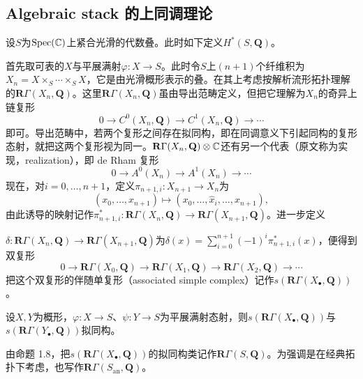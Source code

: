 \subsection{Algebraic stack 的上同调理论}

设$S$为$\operatorname{Spec}(\mathbb{C})$上紧合光滑的代数叠。此时如下定义$H^*(S,\mathbf{Q})$。

首先取可表的$X$与平展满射$\varphi:X\to S$。此时令$S$上$(n+1)$个纤维积为$X_n=X\times_S\cdots\times_SX$，它是由光滑概形表示的叠。在其上考虑按解析流形拓扑理解的$\mathbf{R}\Gamma(X_n,\mathbf{Q})$。这里$\mathbf{R}\Gamma(X_n,\mathbf{Q})$虽由导出范畴定义，但把它理解为$X_n$的奇异上链复形
\[
0\to C^0(X_n,\mathbf{Q})\to C^1(X_n,\mathbf{Q})\to\cdots
\]
即可。导出范畴中，若两个复形之间存在拟同构，即在同调意义下引起同构的复形态射，就把这两个复形视为同一。$\mathbf{R}\Gamma(X_n,\mathbf{Q})\otimes\mathbb{C}$还有另一个代表（原文称为实现，realization），即 de Rham 复形
\[
0\to A^0(X_n)\to A^1(X_n)\to\cdots
\]
现在，对$i=0,\ldots,n+1$，定义$\pi_{n+1,i}:X_{n+1}\to X_n$为
\[
(x_0,\ldots,x_{n+1})\mapsto(x_0,\ldots,\hat x_i,\ldots,x_{n+1}),
\]
由此诱导的映射记作$\pi^*_{n+1,i}:\mathbf{R}\Gamma(X_n,\mathbf{Q})\to\mathbf{R}\Gamma(X_{n+1},\mathbf{Q})$。进一步定义

$\delta:\mathbf{R}\Gamma(X_n,\mathbf{Q})\to\mathbf{R}\Gamma(X_{n+1},\mathbf{Q})$为$\delta(x)=\sum_{i=0}^{n+1}(-1)^i\pi^*_{n+1,i}(x)$，便得到双复形
\[
0\to\mathbf{R}\Gamma(X_0,\mathbf{Q})\to\mathbf{R}\Gamma(X_1,\mathbf{Q})\to\mathbf{R}\Gamma(X_2,\mathbf{Q})\to\cdots
\]
把这个双复形的伴随单复形（associated simple complex）记作$s(\mathbf{R}\Gamma(X_\bullet,\mathbf{Q}))$。

\addtocounter{theorem}{-1}
\begin{proposition}
设$X,Y$为概形，$\varphi:X\to S$、$\psi:Y\to S$为平展满射态射，则$s(\mathbf{R}\Gamma(X_\bullet,\mathbf{Q}))$与$s(\mathbf{R}\Gamma(Y_\bullet,\mathbf{Q}))$拟同构。
\end{proposition}


由命题 1.8，把$s(\mathbf{R}\Gamma(X_\bullet,\mathbf{Q}))$的拟同构类记作$\mathbf{R}\Gamma(S,\mathbf{Q})$。为强调是在经典拓扑下考虑，也写作$\mathbf{R}\Gamma(S_{\mathrm{an}},\mathbf{Q})$。

